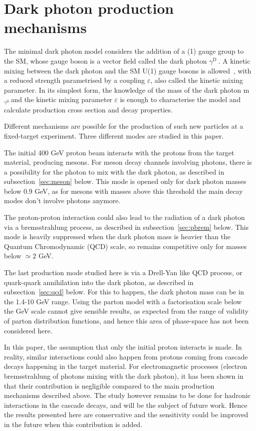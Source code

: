 \documentclass[12pt,a4paper,]{article}
\newcommand{\mathDP}{\gamma^{\mathrm{D}}\ }
\newcommand{\DP}{$\mathDP$}
\newcommand{\mDP}{m$_{\mathDP}$}
\begin{document}
\section{Dark photon production mechanisms}
\label{sec:DPprod}

The minimal dark photon model considers the addition of a (1)
gauge group to the SM, whose gauge boson is a vector field called the
dark photon \DP. A kinetic mixing between the dark
photon and the SM U(1) gauge bosons is allowed~\cite{Holdom:1985ag}, with a
reduced strength parametrised by a coupling $\varepsilon$, also called
the kinetic mixing parameter. In its simplest form, the knowledge of
the mass of the dark photon \mDP and the kinetic
mixing parameter $\varepsilon$ is enough to characterise the model and
calculate production cross section and decay properties.

Different mechanisms are possible for the production of such new
particles at a fixed-target experiment. Three different modes are
studied in this paper.

The initial 400 GeV proton beam interacts with the protons from the
target material, producing mesons. For meson decay channels involving
photons, there is a possibility for the photon to mix with the dark
photon, as described in subsection~\ref{sec:meson} below. This mode is
opened only for dark photon masses below 0.9 GeV, as for mesons with
masses above this threshold the main decay modes don't involve photons
anymore.

The proton-proton interaction could also lead to the radiation of a
dark photon via a bremsstrahlung process, as described in
subsection~\ref{sec:pbrem} below. This mode is heavily suppressed when
the dark photon mass is heavier than the Quantum Chromodynamic (QCD)
scale, so remains competitive only for masses below $\simeq 2$ GeV.

The last production mode studied here is via a Drell-Yan like QCD
process, or quark-quark annihilation into the dark photon, as
described in subsection~\ref{sec:qcd} below. For this to happen, the
dark photon mass can be in the 1.4-10 GeV range. Using the parton model
with a factorisation scale below the GeV scale cannot give sensible
results, as expected from the range of validity of parton distribution
functions, and hence this area of phase-space has not been considered
here.

In this paper, the assumption that only the initial proton interacts
is made. In reality, similar interactions could also happen from
protons coming from cascade decays happening in the target
material. For electromagnetic processes (electron bremsstrahlung of
photons mixing with the dark photon), it has been shown
in~\cite{Gorbunov:2014wqa} that their contribution is negligible
compared to the main production mechanisms described above. The study
however remains to be done for hadronic interactions in the cascade
decays, and will be the subject of future work. Hence the results
presented here are conservative and the sensitivity could be improved
in the future when this contribution is added.
\end{document}
